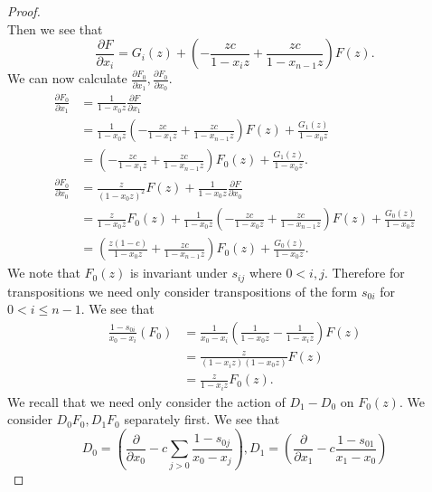 \documentclass{amsart}
\numberwithin{equation}{section}
\theoremstyle{definition}
\begin{document}
\begin{proof}
\[\]
Then we see that 
\[
\frac{\partial F}{\partial x_i}=G_i(z)+\left(-\frac{zc}{1-x_iz}+\frac{zc}{1-x_{n-1}z}\right)F(z).
\]
We can now calculate $\frac{\partial F_0}{\partial x_1},\frac{\partial F_0}{\partial x_0}$. 
\begin{align*}
\frac{\partial F_0}{\partial x_1}%
&=\frac{1}{1-x_0z}\frac{\partial F}{\partial x_1}\\
&=\frac{1}{1-x_0z}\left(-\frac{zc}{1-x_1z}+\frac{zc}{1-x_{n-1}z}\right)F(z)+\frac{G_1(z)}{1-x_0z}\\
&=\left(-\frac{zc}{1-x_1z}+\frac{zc}{1-x_{n-1}z}\right)F_0(z)+\frac{G_1(z)}{1-x_0z}.\\
\frac{\partial F_0}{\partial x_0}%
&=\frac{z}{(1-x_0z)^2}F(z)+\frac{1}{1-x_0z}\frac{\partial F}{\partial x_0}\\
&=\frac{z}{1-x_0z}F_0(z)+\frac{1}{1-x_0z}\left(-\frac{zc}{1-x_0z}+\frac{zc}{1-x_{n-1}z}\right)F(z)+\frac{G_0(z)}{1-x_0z}\\
&=\left(\frac{z(1-c)}{1-x_0z}+\frac{zc}{1-x_{n-1}z}\right)F_0(z)+\frac{G_0(z)}{1-x_0z}.
\end{align*}
We note that $F_0(z)$ is invariant under $s_{ij}$ where $0 < i,j$. Therefore for transpositions we need only consider transpositions of the form $s_{0i}$ for $0 < i \le n-1$. We see that 
\begin{align*}
\frac{1-s_{0i}}{x_0-x_i}(F_0)%
&=\frac{1}{x_0-x_i}\left(\frac{1}{1-x_0z}-\frac{1}{1-x_iz}\right)F(z)\\
&=\frac{z}{(1-x_iz)(1-x_0z)}F(z)\\
&=\frac{z}{1-x_iz}F_0(z).
\end{align*}
We recall that we need only consider the action of $D_1-D_0$ on $F_0(z)$. We consider $D_0F_0, D_1F_0$ separately first. We see that 
\[
D_0=\left(\frac{\partial}{\partial x_0}-c\sum_{j > 0} \frac{1-s_{0j}}{x_0-x_j}\right), D_1=\left(\frac{\partial}{\partial x_1}-c \frac{1-s_{01}}{x_1-x_0}\right)
\]
\end{proof}
\end{document}
